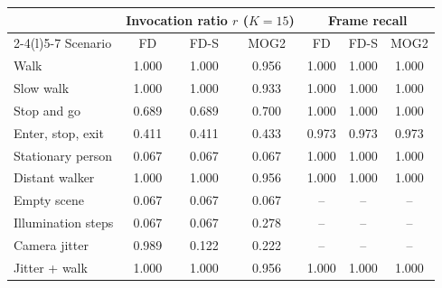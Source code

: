 \begin{tabular}{@{}lcccccc@{}}
\toprule
 & \multicolumn{3}{c}{Invocation ratio $r$ ($K=15$)} & \multicolumn{3}{c}{Frame recall} \\
\cmidrule(lr){2-4}\cmidrule(l){5-7}
Scenario & FD & FD-S & MOG2 & FD & FD-S & MOG2 \\
\midrule
Walk & 1.000 & 1.000 & 0.956 & 1.000 & 1.000 & 1.000 \\
Slow walk & 1.000 & 1.000 & 0.933 & 1.000 & 1.000 & 1.000 \\
Stop and go & 0.689 & 0.689 & 0.700 & 1.000 & 1.000 & 1.000 \\
Enter, stop, exit & 0.411 & 0.411 & 0.433 & 0.973 & 0.973 & 0.973 \\
Stationary person & 0.067 & 0.067 & 0.067 & 1.000 & 1.000 & 1.000 \\
Distant walker & 1.000 & 1.000 & 0.956 & 1.000 & 1.000 & 1.000 \\
Empty scene & 0.067 & 0.067 & 0.067 & -- & -- & -- \\
Illumination steps & 0.067 & 0.067 & 0.278 & -- & -- & -- \\
Camera jitter & 0.989 & 0.122 & 0.222 & -- & -- & -- \\
Jitter + walk & 1.000 & 1.000 & 0.956 & 1.000 & 1.000 & 1.000 \\
\bottomrule
\end{tabular}
